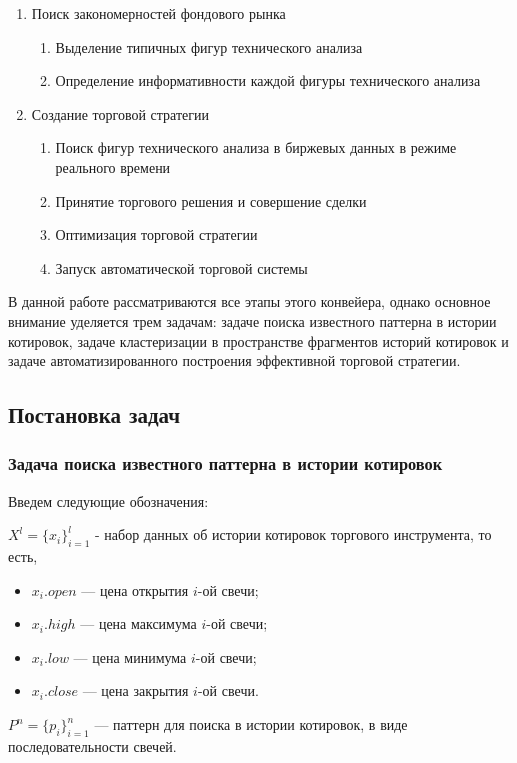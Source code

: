 \documentclass[a4paper, 14pt]{extarticle}
\numberwithin{figure}{subsection}
\numberwithin{equation}{subsection}
\begin{document}
\begin{enumerate}
\item Поиск закономерностей фондового рынка
\begin{enumerate}
\item Выделение типичных фигур технического анализа
\item Определение информативности каждой фигуры технического анализа
\end{enumerate}
\item Создание торговой стратегии
\begin{enumerate}
\item Поиск фигур технического анализа в биржевых данных в режиме реального времени
\item Принятие торгового решения и совершение сделки
\item Оптимизация торговой стратегии
\item Запуск автоматической торговой системы
\end{enumerate}
\end{enumerate}

В данной работе рассматриваются все этапы этого конвейера, однако основное внимание уделяется трем задачам: задаче поиска известного паттерна в истории котировок, задаче кластеризации в пространстве фрагментов историй котировок и задаче автоматизированного построения эффективной торговой стратегии.

\subsection{Постановка задач}
\subsubsection{Задача поиска известного паттерна в истории котировок}

Введем следующие обозначения:

$X^l = \{x_i\}_{i=1}^l$ - набор данных об истории котировок торгового инструмента, то есть,
\begin{itemize}
\item $x_i.open$ --- цена открытия $i$-ой свечи;
\item $x_i.high$ --- цена максимума $i$-ой свечи;
\item $x_i.low$ --- цена минимума $i$-ой свечи;
\item $x_i.close$ --- цена закрытия $i$-ой свечи.
\end{itemize}

$P^n = \{p_i\}_{i=1}^n$ --- паттерн для поиска в истории котировок, в виде последовательности свечей.
\end{document}
